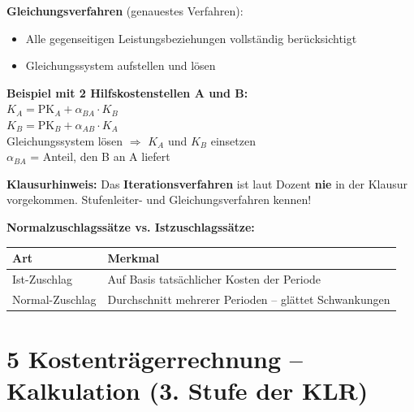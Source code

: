 \documentclass[10pt,a4paper]{article}
\begin{document}
\begin{multicols}{2}
\vspace{4pt}
\textbf{Gleichungsverfahren} (genauestes Verfahren):
\begin{itemize}[noitemsep, leftmargin=*]
  \item Alle gegenseitigen Leistungsbeziehungen vollständig berücksichtigt
  \item Gleichungssystem aufstellen und lösen
\end{itemize}

\begin{formelbox}
\textbf{Beispiel mit 2 Hilfskostenstellen A und B:}\\[4pt]
$K_A = \text{PK}_A + \alpha_{BA} \cdot K_B$\\[2pt]
$K_B = \text{PK}_B + \alpha_{AB} \cdot K_A$\\[4pt]
Gleichungssystem lösen $\Rightarrow$ $K_A$ und $K_B$ einsetzen\\[2pt]
$\alpha_{BA}$ = Anteil, den B an A liefert
\end{formelbox}

\begin{hinweisbox}
\textbf{Klausurhinweis:} Das \textbf{Iterationsverfahren} ist laut Dozent \textbf{nie} in der Klausur vorgekommen. Stufenleiter- und Gleichungsverfahren kennen!
\end{hinweisbox}

\vspace{4pt}
\textbf{Normalzuschlagssätze vs. Istzuschlagssätze:}

\begin{tabular}{|L{2.5cm}|L{4.5cm}|}
\hline
{}
\textbf{Art} & \textbf{Merkmal} \\
\hline
Ist-Zuschlag & Auf Basis tatsächlicher Kosten der Periode \\
Normal-Zuschlag & Durchschnitt mehrerer Perioden -- glättet Schwankungen \\
\hline
\end{tabular}

\end{multicols}

\newpage

\section{5 \quad Kostenträgerrechnung -- Kalkulation (3. Stufe der KLR)}
\end{document}
